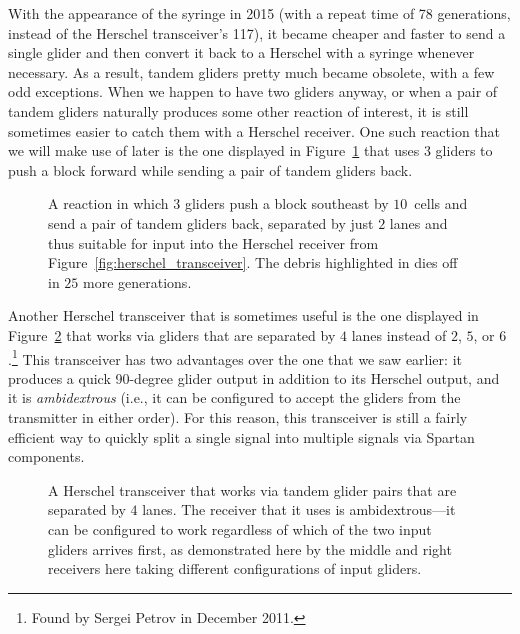 With the appearance of the syringe in 2015 (with a repeat time of 78 generations, instead of the Herschel transceiver's 117), it became cheaper and faster to send a single glider and then convert it back to a Herschel with a syringe whenever necessary. As a result, tandem gliders pretty much became obsolete, with a few odd exceptions. When we happen to have two gliders anyway, or when a pair of tandem gliders naturally produces some other reaction of interest, it is still sometimes easier to catch them with a Herschel receiver. One such reaction that we will make use of later is the one displayed in Figure~\ref{fig:block_pusher} that uses $3$ gliders to push a block forward while sending a pair of tandem gliders back.

\begin{figure}[!htb]
	\centering{}
	\caption{A reaction in which $3$ gliders push a block southeast by $10$~cells and send a pair of tandem gliders back, separated by just $2$ lanes and thus suitable for input into the Herschel receiver from Figure~\ref{fig:herschel_transceiver}. The debris highlighted in  dies off in $25$ more generations.}\label{fig:block_pusher}
\end{figure}

Another Herschel transceiver that is sometimes useful is the one displayed in Figure~\ref{fig:herschel_transceiver_4} that works via gliders that are separated by $4$ lanes instead of $2$, $5$, or $6$.\footnote{Found by Sergei Petrov in December 2011.} This transceiver has two advantages over the one that we saw earlier: it produces a quick 90-degree glider output in addition to its Herschel output, and it is \emph{ambidextrous} (i.e., it can be configured to accept the gliders from the transmitter in either order). For this reason, this transceiver is still a fairly efficient way to quickly split a single signal into multiple signals via Spartan components.

\begin{figure}[!htb]
	\centering
	\caption{A Herschel transceiver that works via tandem glider pairs that are separated by $4$ lanes. The receiver that it uses is ambidextrous---it can be configured to work regardless of which of the two input gliders arrives first, as demonstrated here by the middle and right receivers here taking different configurations of input gliders.}
	\label{fig:herschel_transceiver_4}
\end{figure}

